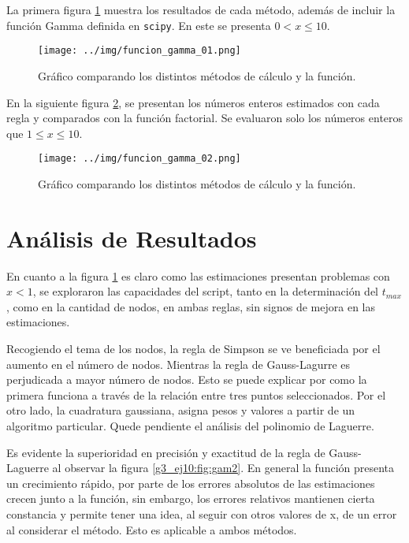 \documentclass[../portafolio.tex]{subfiles}
\begin{document}
La primera figura \ref{g3_ej10:fig:gam0} muestra los resultados de cada método, además de incluir la función Gamma definida en \texttt{scipy}. En este se presenta $0<x\leq 10$.

\begin{figure}
\centering
\texttt{[image: ../img/funcion\_gamma\_01.png]} 
\caption{Gráfico comparando los distintos métodos de cálculo y la función.}\label{g3_ej10:fig:gam0}
\end{figure}

En la siguiente figura \ref{g3_ej10:fig:gam1}, se presentan los números enteros estimados con cada regla y comparados con la función factorial. Se evaluaron solo los números enteros que $1\leq x\leq 10$.

\begin{figure}
\centering
\texttt{[image: ../img/funcion\_gamma\_02.png]} 
\caption{Gráfico comparando los distintos métodos de cálculo y la función.}\label{g3_ej10:fig:gam1}
\end{figure}

\section{Análisis de Resultados}

En cuanto a la figura \ref{g3_ej10:fig:gam0} es claro como las estimaciones presentan problemas con $x<1$, se exploraron las capacidades del script, tanto en la determinación del $t_{max}$, como en la cantidad de nodos, en ambas reglas, sin signos de mejora en las estimaciones.

Recogiendo el tema de los nodos, la regla de Simpson se ve beneficiada por el aumento en el número de nodos. Mientras la regla de Gauss-Lagurre es perjudicada a mayor número de nodos. Esto se puede explicar por como la primera funciona a través de la relación entre tres puntos seleccionados. Por el otro lado, la cuadratura gaussiana, asigna pesos y valores a partir de un algoritmo particular. Quede pendiente el análisis del polinomio de Laguerre.

Es evidente la superioridad en precisión y exactitud de la regla de Gauss-Laguerre al observar la figura \ref{g3_ej10:fig:gam2}. En general la función presenta un crecimiento rápido, por parte de los errores absolutos de las estimaciones crecen junto a la función, sin embargo, los errores relativos mantienen cierta constancia y permite tener una idea, al seguir con otros valores de x, de un error al considerar el método. Esto es aplicable a ambos métodos.
\end{document}
